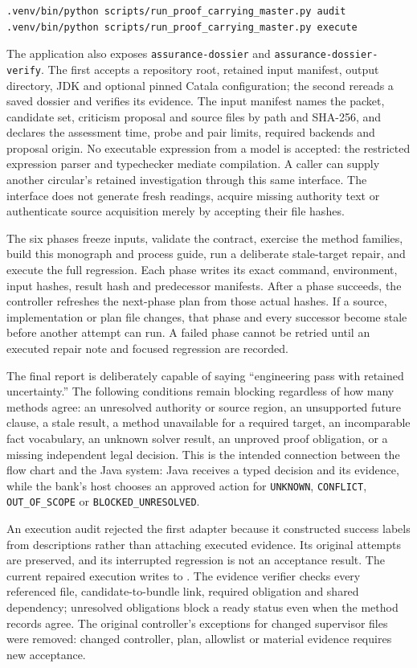 \begin{lstlisting}
.venv/bin/python scripts/run_proof_carrying_master.py audit
.venv/bin/python scripts/run_proof_carrying_master.py execute
\end{lstlisting}

The application also exposes \texttt{assurance-dossier} and
\texttt{assurance-dossier-verify}. The first accepts a repository root, retained
input manifest, output directory, JDK and optional pinned Catala configuration;
the second rereads a saved dossier and verifies its evidence. The input manifest
names the packet, candidate set, criticism proposal and source files by path and
SHA-256, and declares the assessment time, probe and pair limits, required
backends and proposal origin. No executable expression from a model is accepted:
the restricted expression parser and typechecker mediate compilation. A caller
can supply another circular's retained investigation through this same interface.
The interface does not generate fresh readings, acquire missing authority text
or authenticate source acquisition merely by accepting their file hashes.

The six phases freeze inputs, validate the contract, exercise the method
families, build this monograph and process guide, run a deliberate stale-target
repair, and execute the full regression. Each phase writes its exact command,
environment, input hashes, result hash and predecessor manifests. After a
phase succeeds, the controller refreshes the next-phase plan from those actual
hashes. If a source, implementation or plan file changes, that phase and every
successor become stale before another attempt can run. A failed phase cannot be
retried until an executed repair note and focused regression are recorded.

The final report is deliberately capable of saying ``engineering pass with
retained uncertainty.'' The following conditions remain blocking regardless of
how many methods agree: an unresolved authority or source region, an unsupported
future clause, a stale result, a method unavailable for a required target, an
incomparable fact vocabulary, an unknown solver result, an unproved proof
obligation, or a missing independent legal decision. This is the intended
connection between the flow chart and the Java system: Java receives a typed
decision and its evidence, while the bank's host chooses an approved action for
\texttt{UNKNOWN}, \texttt{CONFLICT}, \texttt{OUT\_OF\_SCOPE} or
\texttt{BLOCKED\_UNRESOLVED}.

An execution audit rejected the first adapter because it constructed success
labels from descriptions rather than attaching executed evidence. Its original
attempts are preserved, and its interrupted regression is not an acceptance
result. The current repaired execution writes to
.
The evidence verifier checks every referenced file, candidate-to-bundle link,
required obligation and shared dependency; unresolved obligations block a ready
status even when the method records agree. The original controller's exceptions
for changed supervisor files were removed: changed controller, plan, allowlist
or material evidence requires new acceptance.

